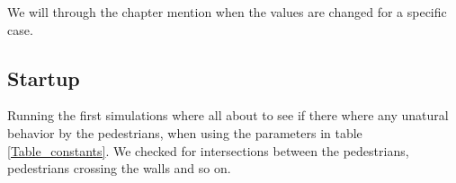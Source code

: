 We will through the chapter mention when the values are changed for a specific case.  

\subsection{Startup}
Running the first simulations where all about to see if there where any unatural behavior 
by the pedestrians, when using the parameters in table \ref{Table_constants}. We checked for intersections between the pedestrians, pedestrians crossing the walls and so on.

\begin{figure}[h]
\centering
{}

\end{figure}
